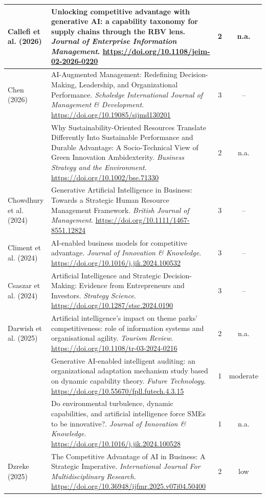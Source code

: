 {\begin{longtable}{|>{\raggedright\arraybackslash}p{2.6cm}|>{\raggedright\arraybackslash}p{10.2cm}|c|c|}
Callefi et al. (2026) & Unlocking competitive advantage with generative AI: a capability taxonomy for supply chains through the RBV lens. \textit{Journal of Enterprise Information Management}. \url{https://doi.org/10.1108/jeim-02-2026-0220} & 2 & n.a. \\ \hline
Chen (2026) & AI-Augmented Management: Redefining Decision-Making, Leadership, and Organizational Performance. \textit{Scholedge International Journal of Management \& Development}. \url{https://doi.org/10.19085/sijmd130201} & 3 & -- \\ \hline
\textcite{chen2026} & Why Sustainability-Oriented Resources Translate Differently Into Sustainable Performance and Durable Advantage: A Socio-Technical View of Green Innovation Ambidexterity. \textit{Business Strategy and the Environment}. \url{https://doi.org/10.1002/bse.71330} & 2 & n.a. \\ \hline
Chowdhury et al. (2024) & Generative Artificial Intelligence in Business: Towards a Strategic Human Resource Management Framework. \textit{British Journal of Management}. \url{https://doi.org/10.1111/1467-8551.12824} & 3 & -- \\ \hline
Climent et al. (2024) & AI-enabled business models for competitive advantage. \textit{Journal of Innovation \& Knowledge}. \url{https://doi.org/10.1016/j.jik.2024.100532} & 3 & -- \\ \hline
Csaszar et al. (2024) & Artificial Intelligence and Strategic Decision-Making: Evidence from Entrepreneurs and Investors. \textit{Strategy Science}. \url{https://doi.org/10.1287/stsc.2024.0190} & 3 & -- \\ \hline
Darwish et al. (2025) & Artificial intelligence’s impact on theme parks’ competitiveness: role of information systems and organisational agility. \textit{Tourism Review}. \url{https://doi.org/10.1108/tr-03-2024-0216} & 2 & n.a. \\ \hline
\textcite{deng2025} & Generative AI-enabled intelligent auditing: an organizational adaptation mechanism study based on dynamic capability theory. \textit{Future Technology}. \url{https://doi.org/10.55670/fpll.futech.4.3.15} & 1 & moderate \\ \hline
\textcite{aldhaheri2024} & Do environmental turbulence, dynamic capabilities, and artificial intelligence force SMEs to be innovative?. \textit{Journal of Innovation \& Knowledge}. \url{https://doi.org/10.1016/j.jik.2024.100528} & 1 & n.a. \\ \hline
Dzreke (2025) & The Competitive Advantage of AI in Business: A Strategic Imperative. \textit{International Journal For Multidisciplinary Research}. \url{https://doi.org/10.36948/ijfmr.2025.v07i04.50400} & 2 & low \\ \hline

\end{longtable}}
